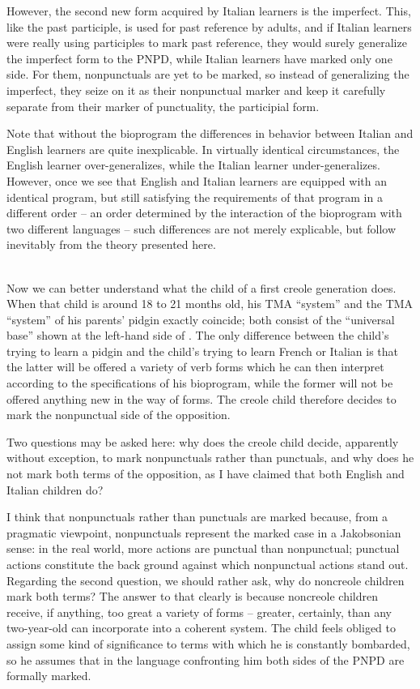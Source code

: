 However, the second new form acquired by Italian learners is the imperfect. This, like the past participle, is used for past reference by adults, and if Italian learners were really using participles to mark past reference, they would surely generalize the imperfect form to
the PNPD, while Italian learners have marked only one side. For them, nonpunctuals are yet to be marked, so instead of generalizing the imperfect, they seize on it as their nonpunctual marker and keep it carefully separate from their marker of punctuality, the participial form.

Note that without the bioprogram the differences in behavior between Italian and English learners are quite inexplicable. In virtually identical circumstances, the English learner over-generalizes, while the Italian learner under-generalizes. However, once we see that English and Italian learners are equipped with an identical program, but still satisfying the requirements of that program in a different order -- an order determined by the interaction of the bioprogram with two different languages -- such differences are not merely explicable, but follow inevitably from the theory presented here.\\\\

Now we can better understand what the child of a first creole generation does. When that child is around 18 to 21 months old, his TMA ``system'' and the TMA ``system'' of his parents' pidgin exactly coincide; both consist of the ``universal base'' shown at the left-hand side of . The only difference between the child's trying to learn a pidgin and the child's trying to learn French or Italian is that the latter will be offered a variety of verb forms which he can then interpret according to the specifications of his bioprogram, while the former will not be offered anything new in the way of forms. The creole child therefore decides to mark the nonpunctual side of the opposition.

Two questions may be asked here: why does the creole child decide, apparently without exception, to mark nonpunctuals rather than punctuals, and why does he not mark both terms of the opposition, as I have claimed that both English and Italian children do?

I think that nonpunctuals rather than punctuals are marked because, from a pragmatic viewpoint, nonpunctuals represent the marked case in a Jakobsonian sense: in the real world, more actions are punctual than nonpunctual; punctual actions constitute the back%
ground against which nonpunctual actions stand out. Regarding the second question, we should rather ask, why do noncreole children mark both terms? The answer to that clearly is because noncreole children receive, if anything, too great a variety of forms -- greater, certainly, than any two-year-old can incorporate into a coherent system. The child feels obliged to assign some kind of significance to terms with which he is constantly bombarded, so he assumes that in the language confronting him both sides of the PNPD are formally marked.

